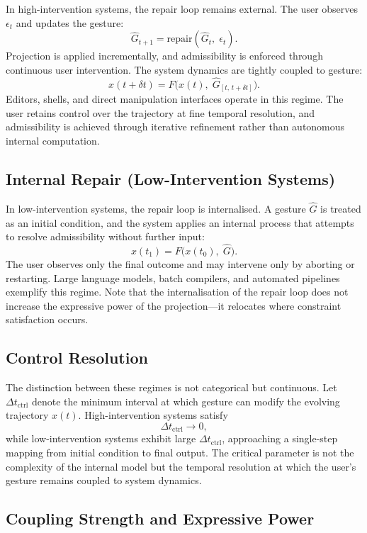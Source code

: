 \documentclass[11pt, a4paper]{article}
\begin{document}
In high-intervention systems, the repair loop remains external. The user
observes $\epsilon_t$ and updates the gesture:
\[
  \hat{G}_{t+1} = \mathrm{repair}(\hat{G}_t,\; \epsilon_t).
\]
Projection is applied incrementally, and admissibility is enforced
through continuous user intervention. The system dynamics are tightly
coupled to gesture:
\[
  x(t+\delta t) = F\bigl(x(t),\; \hat{G}_{[t,\, t+\delta t]}\bigr).
\]
Editors, shells, and direct manipulation interfaces operate in this
regime. The user retains control over the trajectory at fine temporal
resolution, and admissibility is achieved through iterative refinement
rather than autonomous internal computation.

\subsection{Internal Repair (Low-Intervention Systems)}

In low-intervention systems, the repair loop is internalised. A gesture
$\hat{G}$ is treated as an initial condition, and the system applies an
internal process that attempts to resolve admissibility without further
input:
\[
  x(t_1) = F\bigl(x(t_0),\; \hat{G}\bigr).
\]
The user observes only the final outcome and may intervene only by
aborting or restarting. Large language models, batch compilers, and
automated pipelines exemplify this regime. Note that the internalisation
of the repair loop does not increase the expressive power of the
projection---it relocates where constraint satisfaction occurs.

\subsection{Control Resolution}

The distinction between these regimes is not categorical but continuous.
Let $\Delta t_{\mathrm{ctrl}}$ denote the minimum interval at which
gesture can modify the evolving trajectory $x(t)$. High-intervention
systems satisfy
\[
  \Delta t_{\mathrm{ctrl}} \to 0,
\]
while low-intervention systems exhibit large $\Delta t_{\mathrm{ctrl}}$,
approaching a single-step mapping from initial condition to final output.
The critical parameter is not the complexity of the internal model but
the temporal resolution at which the user's gesture remains coupled to
system dynamics.

\subsection{Coupling Strength and Expressive Power}
\end{document}
